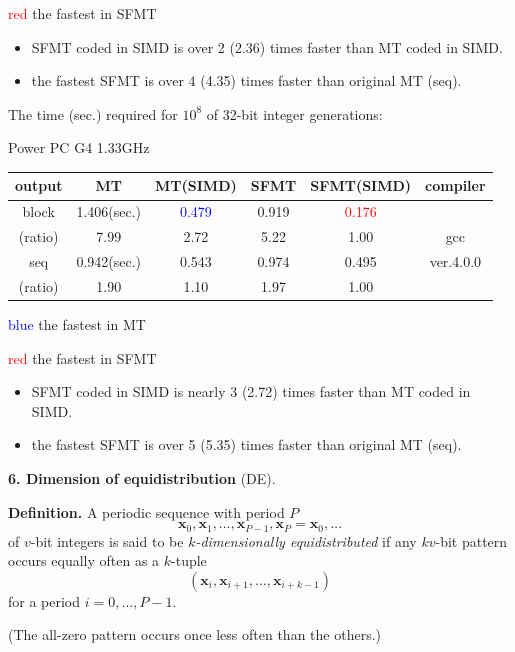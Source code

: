 \documentclass[a4j,12pt,landscape]{jarticle}
\def\bx{{{\mathbf x}}}
\begin{document}
\textcolor{red}{red} the fastest in SFMT
\begin{itemize}
  \item SFMT coded in SIMD is over 2 (2.36) times faster than MT
 coded in SIMD.
  \item the fastest SFMT is over 4 (4.35) times faster than original MT (seq).
\end{itemize}

\newpage
\begin{center}
The time (sec.) required for $10^8$ 
of 32-bit integer generations:

Power PC G4 1.33GHz

\vskip 2mm
\begin{tabular}{|c||c|c|c|c|c|}
\hline
output & MT & MT{\Large(SIMD)} & SFMT & SFMT{\Large (SIMD)} & compiler
\\ \hline \hline
block &1.406(sec.) & \textcolor{blue}{0.479}
 & 0.919 & \textcolor{red}{0.176} & \phantom{intel C/C++}\\ \cline{2-5}
(ratio)& 7.99\phantom{0} & 2.72\phantom{0}  & 5.22\phantom{0} & 1.00\phantom{0} & gcc \\ \cline{1-5}
 seq & 0.942(sec.) & 0.543 & 0.974 & 0.495 & ver.4.0.0 \\ \cline{2-5}
(ratio)& 1.90\phantom{0} & 1.10\phantom{0} & 1.97\phantom{0} & 1.00\phantom{0} & \\ \hline
\end{tabular}
\end{center}
\textcolor{blue}{blue} the fastest in MT

\textcolor{red}{red} the fastest in SFMT
\begin{itemize}
  \item SFMT coded in SIMD is nearly 3 (2.72) times faster than MT
 coded in SIMD.
  \item the fastest SFMT is over 5 (5.35) times faster than original MT (seq).
\end{itemize}

\newpage
\noindent
{\bf 6. Dimension of equidistribution} (DE).

{\bf Definition.} 
A periodic sequence with period $P$
$$\bx_0, \bx_1, \ldots, \bx_{P-1}, \bx_P=\bx_0, \ldots$$
of $v$-bit integers is said to be {\em $k$-dimensionally equidistributed}
if any $kv$-bit pattern occurs equally often as a $k$-tuple
$$
(\bx_i, \bx_{i+1}, \ldots, \bx_{i+k-1})
$$
for a period $i=0,\ldots, P-1$. 

(The all-zero pattern occurs once less often than the others.)
\end{document}

